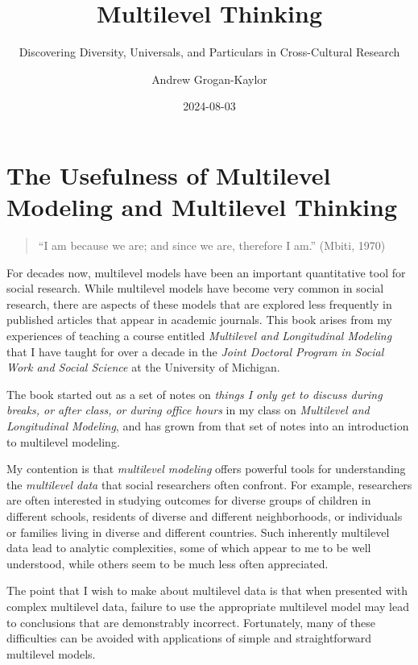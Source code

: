 \documentclass[
  letterpaper,
  DIV=11,
  numbers=noendperiod]{scrreprt}
\title{Multilevel Thinking}
\subtitle{Discovering Diversity, Universals, and Particulars in
Cross-Cultural Research}
\author{Andrew Grogan-Kaylor}
\date{2024-08-03}
\renewcommand*\contentsname{Table of contents}
\newcommand\contentsname{Table of contents}
\begin{document}
\maketitle

\renewcommand*\contentsname{Table of contents}
{
\hypersetup{linkcolor=}
\setcounter{tocdepth}{2}
\tableofcontents
}
\listoffigures
\listoftables
{}

\chapter{The Usefulness of Multilevel Modeling and Multilevel
Thinking}\label{sec-multilevel-thinking}

\begin{quote}
``I am because we are; and since we are, therefore I am.'' (Mbiti, 1970)
\end{quote}

For decades now, multilevel models have been an important quantitative
tool for social research. While multilevel models have become very
common in social research, there are aspects of these models that are
explored less frequently in published articles that appear in academic
journals. This book arises from my experiences of teaching a course
entitled \emph{Multilevel and Longitudinal Modeling} that I have taught
for over a decade in the \emph{Joint Doctoral Program in Social Work and
Social Science} at the University of Michigan.

The book started out as a set of notes on \emph{things I only get to
discuss during breaks, or after class, or during office hours} in my
class on \emph{Multilevel and Longitudinal Modeling}, and has grown from
that set of notes into an introduction to multilevel modeling.

My contention is that \emph{multilevel modeling} offers powerful tools
for understanding the \emph{multilevel data} that social researchers
often confront. For example, researchers are often interested in
studying outcomes for diverse groups of children in different schools,
residents of diverse and different neighborhoods, or individuals or
families living in diverse and different countries. Such inherently
multilevel data lead to analytic complexities, some of which appear to
me to be well understood, while others seem to be much less often
appreciated.

The point that I wish to make about multilevel data is that when
presented with complex multilevel data, failure to use the appropriate
multilevel model may lead to conclusions that are demonstrably
incorrect. Fortunately, many of these difficulties can be avoided with
applications of simple and straightforward multilevel models.
 
\end{document}
